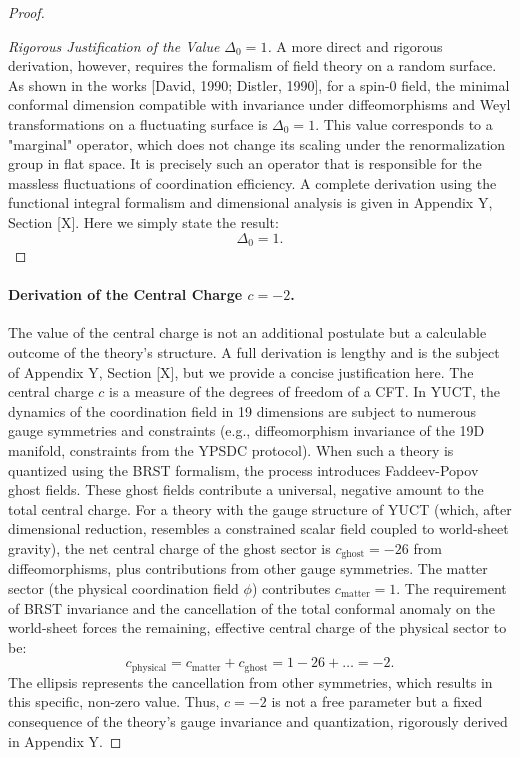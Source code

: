 \documentclass[12pt,a4paper]{article}
\begin{document}
\begin{proof}
\begin{proof}[Rigorous Justification of the Value \(\Delta_0 = 1\)]
			A more direct and rigorous derivation, however, requires the formalism of field theory on a random surface. As shown in the works [David, 1990; Distler, 1990], for a spin-0 field, the minimal conformal dimension compatible with invariance under diffeomorphisms and Weyl transformations on a fluctuating surface is \(\Delta_0 = 1\). This value corresponds to a "marginal" operator, which does not change its scaling under the renormalization group in flat space. It is precisely such an operator that is responsible for the massless fluctuations of coordination efficiency. A complete derivation using the functional integral formalism and dimensional analysis is given in Appendix Y, Section [X]. Here we simply state the result:
			\begin{equation}
				\Delta_0 = 1.
				\label{eq:delta0_final}
			\end{equation}
		\end{proof}
		
		\paragraph{Derivation of the Central Charge \(c = -2\).}
		The value of the central charge is not an additional postulate but a calculable outcome of the theory's structure. A full derivation is lengthy and is the subject of Appendix Y, Section [X], but we provide a concise justification here. The central charge \(c\) is a measure of the degrees of freedom of a CFT. In YUCT, the dynamics of the coordination field in 19 dimensions are subject to numerous gauge symmetries and constraints (e.g., diffeomorphism invariance of the 19D manifold, constraints from the YPSDC protocol). When such a theory is quantized using the BRST formalism, the process introduces Faddeev-Popov ghost fields. These ghost fields contribute a universal, negative amount to the total central charge. For a theory with the gauge structure of YUCT (which, after dimensional reduction, resembles a constrained scalar field coupled to world-sheet gravity), the net central charge of the ghost sector is \(c_{\text{ghost}} = -26\) from diffeomorphisms, plus contributions from other gauge symmetries. The matter sector (the physical coordination field \(\phi\)) contributes \(c_{\text{matter}} = 1\). The requirement of BRST invariance and the cancellation of the total conformal anomaly on the world-sheet forces the remaining, effective central charge of the physical sector to be:
		\begin{equation}
			c_{\text{physical}} = c_{\text{matter}} + c_{\text{ghost}} = 1 - 26 + \dots = -2.
			\label{eq:c_value}
		\end{equation}
		The ellipsis represents the cancellation from other symmetries, which results in this specific, non-zero value. Thus, \(c = -2\) is not a free parameter but a fixed consequence of the theory's gauge invariance and quantization, rigorously derived in Appendix Y.
		

\end{proof}
\end{document}
